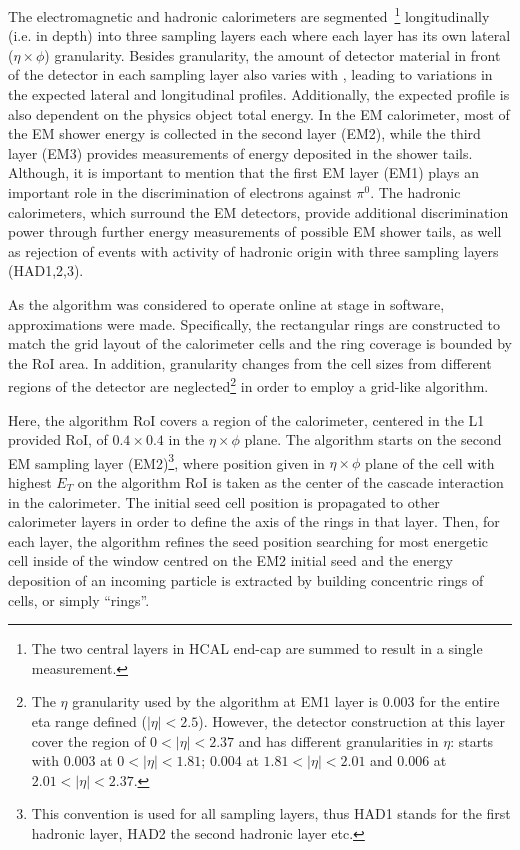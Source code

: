The electromagnetic and hadronic calorimeters are segmented~\cite{PERF-2007-01}\footnote{The two
central layers in HCAL end-cap are summed to result in a single measurement.} longitudinally (i.e. in depth) into three sampling layers each where each layer has its own lateral ($\eta\times\phi$) granularity. Besides granularity, the amount of detector material in front of the detector in each sampling layer also varies with \abseta, leading to variations in the expected lateral and longitudinal profiles. Additionally, the expected
profile is also dependent on the physics object total energy. In the EM calorimeter, most of the EM shower energy is collected in the second layer (EM2), while the third layer (EM3) provides measurements of energy deposited in the shower tails. Although, it is important to mention that the first EM layer (EM1) plays an important role in the discrimination of electrons against $\pi^0$. The hadronic calorimeters, which surround the EM detectors, provide additional discrimination power through further energy measurements of possible EM shower tails, as well as rejection of events with activity of hadronic origin with three sampling layers (HAD1,2,3). 


As the algorithm was considered to operate online at \fastcalo{} stage in software, approximations were made. Specifically, the rectangular rings are constructed to match the grid layout of the calorimeter cells and the ring coverage is bounded by the RoI area. In addition, granularity changes from the cell sizes from different regions of the detector are neglected\footnote{The $\eta$ granularity used by the algorithm at EM1 layer is 0.003 for the entire eta range defined ($|\eta|<2.5$). However, the detector construction at this layer cover the region of $0<|\eta|<2.37$ and has different granularities in $\eta$: starts with 0.003 at $0<|\eta|<1.81$; 0.004 at $1.81<|\eta|<2.01$ and 0.006 at $2.01<|\eta|<2.37$.} in order to employ a grid-like algorithm.


Here, the algorithm RoI covers a
region of the calorimeter, centered in the L1 provided RoI, of
$0.4\times0.4$ in the $\eta\times\phi$ plane. The algorithm
starts on the second EM sampling layer (EM2)\footnote{This convention is used for all sampling layers, thus HAD1 stands for the first hadronic layer, HAD2 the second hadronic layer etc.}, where position given in $\eta\times\phi$ plane of the cell with highest $E_T$ on the algorithm RoI is taken as the center of the cascade interaction in the calorimeter. The initial seed cell position is propagated to other calorimeter layers in order to define the axis of the rings in that layer. Then, for each layer, the algorithm refines the seed position searching for most energetic cell inside of the window centred on the EM2 initial seed and the energy deposition of an incoming particle is extracted by building concentric rings of cells, or simply ``rings''. 

